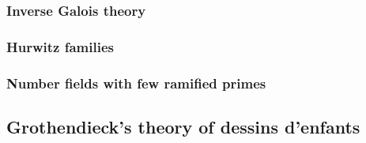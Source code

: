 \documentclass{dcthesis}
\theoremstyle{definition}
\theoremstyle{remark}
\numberwithin{equation}{section}
\numberwithin{figure}{section}
\begin{document}
{{{      \subsubsection{Inverse Galois theory}{
      }
      \subsubsection{Hurwitz families}{
      }
      \subsubsection{Number fields with few ramified primes}{
      }
    }
    \subsection[Dessins d'enfants]{Grothendieck's theory of dessins d'enfants}{
    }
  }
}
\end{document}
